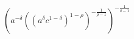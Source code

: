 $\displaystyle \left(a^{- \delta} \left(\left(a^{\delta} c^{1 - \delta}\right)^{1 - \rho}\right)^{- \frac{1}{\rho - 1}}\right)^{- \frac{1}{\delta - 1}}$